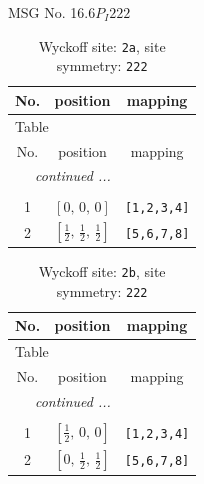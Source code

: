 \documentclass[fleqn,8pt]{jsarticle}
\begin{document}
\setcounter{MaxMatrixCols}{32}

\renewcommand{\tablename}{Table~}
\renewcommand{\figurename}{Figure~}
\begin{center}
\LARGE
MSG No. 16.6\quad$P_{I}222$
\end{center}
\renewcommand{\arraystretch}{1.2}
\begin{longtable}{ccc}
\caption{Wyckoff site: {\tt 2a}, site symmetry: {\tt 222}}
 \\
 \hline \hline
No. & position & mapping \\ \hline \endfirsthead

\multicolumn{2}{l}{\tablename\ \thetable{}} \\
 \hline \hline
No. & position & mapping \\ \hline \endhead

 \hline \hline
\multicolumn{2}{r}{\footnotesize\it continued ...} \\ \endfoot

 \hline \hline
\multicolumn{2}{r}{} \\ \endlastfoot

1 & $\left[ 0,\, 0,\, 0 \right]$ & {\tt [1,2,3,4]} \\ \hline
2 & $\left[ \frac{1}{2},\, \frac{1}{2},\, \frac{1}{2} \right]$ & {\tt [5,6,7,8]} \\
\end{longtable}
\renewcommand{\arraystretch}{1.2}
\begin{longtable}{ccc}
\caption{Wyckoff site: {\tt 2b}, site symmetry: {\tt 222}}
 \\
 \hline \hline
No. & position & mapping \\ \hline \endfirsthead

\multicolumn{2}{l}{\tablename\ \thetable{}} \\
 \hline \hline
No. & position & mapping \\ \hline \endhead

 \hline \hline
\multicolumn{2}{r}{\footnotesize\it continued ...} \\ \endfoot

 \hline \hline
\multicolumn{2}{r}{} \\ \endlastfoot

1 & $\left[ \frac{1}{2},\, 0,\, 0 \right]$ & {\tt [1,2,3,4]} \\ \hline
2 & $\left[ 0,\, \frac{1}{2},\, \frac{1}{2} \right]$ & {\tt [5,6,7,8]} \\
\end{longtable}
\end{document}
